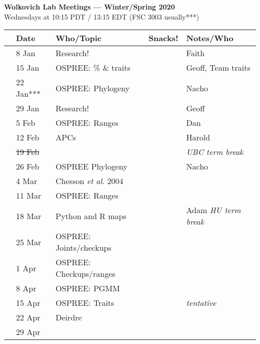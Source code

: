 \documentclass[11pt]{article}
\begin{document}
 
\raggedright
{}

\begin{center} 
{\large \textbf{Wolkovich Lab Meetings --- Winter/Spring 2020}} \\ [2pt]
Wednesdays at 10:15 PDT / 13:15 EDT (FSC 3003 usually***)\\
\end{center} 

\begin{center}
\begin{tabular}{ p{0.2 cm}  p{2 cm}  p{5 cm}  p{2 cm}  p{4 cm} }  \hline \hline
 & \textbf{Date}
   & \textbf{Who/Topic}
      & \textbf{Snacks!} 
         & \textbf{Notes/Who} \\ 
\hline \hline
 & 8 Jan & Research! &       & Faith  \\\hline
 & 15 Jan & OSPREE: \% \& traits   &  & Geoff, Team traits \\\hline
 & 22 Jan*** & OSPREE: Phylogeny &      & Nacho \\\hline  
 & 29 Jan & Research! &       &  Geoff\\\hline
 & 5 Feb & OSPREE: Ranges &  & Dan \\\hline
 & 12 Feb & APCs &    & Harold\\\hline
 & \sout{19 Feb} & &       & \emph{UBC term break}   \\\hline 
 & 26 Feb  & OSPREE Phylogeny  &       & Nacho \\\hline
 & 4 Mar & Chesson \emph{et al.} 2004 &   &     \\\hline
 & 11 Mar & OSPREE: Ranges &       & \\\hline
 & 18 Mar & Python and R maps &       & Adam  \emph{HU term break} \\\hline
 & 25 Mar & OSPREE: Joints/checkups &       &  \\\hline
 & 1 Apr & OSPREE: Checkups/ranges &   & \\\hline
 & 8 Apr & OSPREE: PGMM &    & \\\hline
 & 15 Apr & OSPREE: Traits &    & \emph{tentative} \\\hline
 & 22 Apr & Deirdre &    & \\\hline
 & 29 Apr & &    & \\\hline

\hline
\end{tabular}
\end{center}
\end{document}
